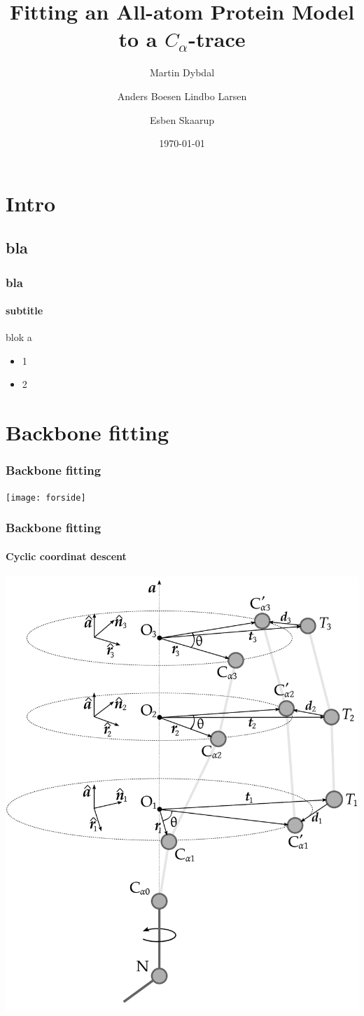 \documentclass{beamer}
\title{Fitting an All-atom Protein Model to a $C_{\alpha}$-trace}
\subtitle{}
\author{Martin Dybdal \and Anders Boesen Lindbo Larsen \and Esben Skaarup}
\institute{\textrm{Datalogisk Institut, Københavns Universitet}}
\date{\today}
\begin{document}
\frame{\titlepage}

\section{Intro}
\subsection{bla}
\begin{frame}[t, fragile]
  \frametitle{bla} 
  \framesubtitle{subtitle}

  \begin{block}{blok}
    a
  \end{block}

  \pause

  \begin{itemize}
    \item 1
    \item 2
  \end{itemize}

\end{frame}

\section{Backbone fitting}
\begin{frame}[t, fragile]
  \frametitle{Backbone fitting} 
\begin{center}
	\texttt{[image: forside]}
\end{center}
\end{frame}

\begin{frame}[t, fragile]
\frametitle{Backbone fitting} 
\framesubtitle{Cyclic coordinat descent}
\begin{center}
	\includegraphics[width=.45\textwidth]{ccd}
\end{center}
\end{frame}
\end{document}
